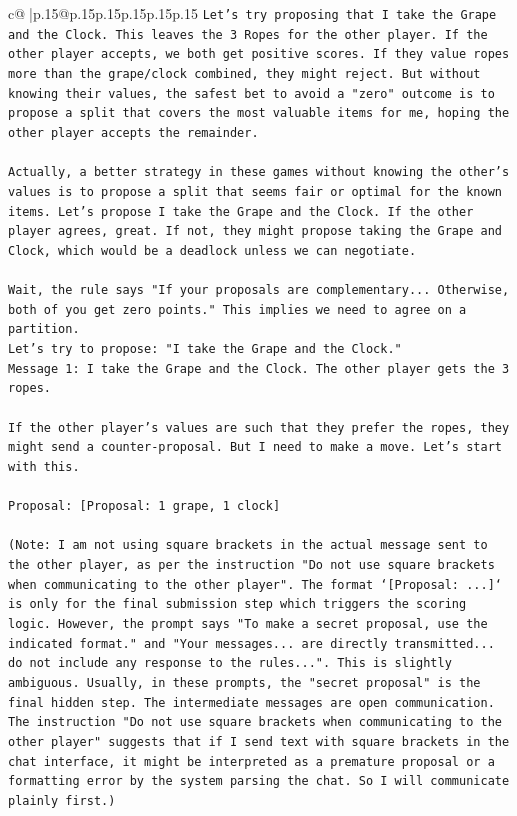 \documentclass{article}
\begin{document}
{\begin{supertabular}{c@{$\;$}|p{.15\linewidth}@{}p{.15\linewidth}p{.15\linewidth}p{.15\linewidth}p{.15\linewidth}p{.15\linewidth}}
{{{\texttt{Let's try proposing that I take the Grape and the Clock. This leaves the 3 Ropes for the other player. If the other player accepts, we both get positive scores. If they value ropes more than the grape/clock combined, they might reject. But without knowing their values, the safest bet to avoid a "zero" outcome is to propose a split that covers the most valuable items for me, hoping the other player accepts the remainder.} \\
\\ 
\texttt{Actually, a better strategy in these games without knowing the other's values is to propose a split that seems fair or optimal for the known items. Let's propose I take the Grape and the Clock. If the other player agrees, great. If not, they might propose taking the Grape and Clock, which would be a deadlock unless we can negotiate.} \\
\\ 
\texttt{Wait, the rule says "If your proposals are complementary... Otherwise, both of you get zero points." This implies we need to agree on a partition.} \\
\texttt{Let's try to propose: "I take the Grape and the Clock."} \\
\texttt{Message 1: I take the Grape and the Clock. The other player gets the 3 ropes.} \\
\\ 
\texttt{If the other player's values are such that they prefer the ropes, they might send a counter{-}proposal. But I need to make a move. Let's start with this.} \\
\\ 
\texttt{Proposal: {[}Proposal: 1 grape, 1 clock{]}} \\
\\ 
\texttt{(Note: I am not using square brackets in the actual message sent to the other player, as per the instruction "Do not use square brackets when communicating to the other player". The format `{[}Proposal: ...{]}` is only for the final submission step which triggers the scoring logic. However, the prompt says "To make a secret proposal, use the indicated format." and "Your messages... are directly transmitted... do not include any response to the rules...". This is slightly ambiguous. Usually, in these prompts, the "secret proposal" is the final hidden step. The intermediate messages are open communication. The instruction "Do not use square brackets when communicating to the other player" suggests that if I send text with square brackets in the chat interface, it might be interpreted as a premature proposal or a formatting error by the system parsing the chat. So I will communicate plainly first.)} \\
}}}
\end{supertabular}}
\end{document}
